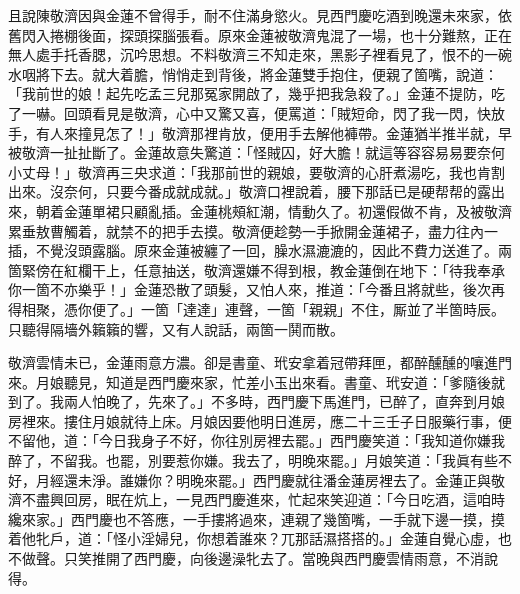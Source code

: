 且說陳敬濟因與金蓮不曾得手，耐不住滿身慾火。見西門慶吃酒到晚還未來家，依舊閃入捲棚後面，探頭探腦張看。原來金蓮被敬濟鬼混了一場，也十分難熬，正在無人處手托香腮，沉吟思想。不料敬濟三不知走來，黑影子裡看見了，恨不的一碗水咽將下去。就大着膽，悄悄走到背後，將金蓮雙手抱住，便親了箇嘴，說道：「我前世的娘！起先吃孟三兒那冤家開啟了，幾乎把我急殺了。」金蓮不提防，吃了一嚇。回頭看見是敬濟，心中又驚又喜，便罵道：{}「賊短命，閃了我一閃，快放手，有人來撞見怎了！」敬濟那裡肯放，便用手去解他褲帶。金蓮猶半推半就，早被敬濟一扯扯斷了。金蓮故意失驚道：「怪賊囚，好大膽！就這等容容易易要奈何小丈母！」{}敬濟再三央求道：「我那前世的親娘，要敬濟的心肝煮湯吃，我也肯割出來。沒奈何，只要今番成就成就。」敬濟口裡說着，腰下那話已是硬帮帮的露出來，朝着金蓮單裙只顧亂插。金蓮桃頰紅潮，情動久了。初還假做不肯，{}及被敬濟累垂敖曹觸着，就禁不的把手去摸。{}敬濟便趁勢一手掀開金蓮裙子，盡力往內一插，不覺沒頭露腦。原來金蓮被纏了一回，臊水濕漉漉的，因此不費力送進了。兩箇緊傍在紅欄干上，任意抽送，敬濟還嫌不得到根，教金蓮倒在地下：「待我奉承你一箇不亦樂乎！」金蓮恐散了頭髮，又怕人來，{}推道：「今番且將就些，後次再得相聚，憑你便了。」{}一箇「達達」連聲，一箇「親親」不住，厮並了半箇時辰。只聽得隔墻外籟籟的響，又有人說話，兩箇一鬨而散。

敬濟雲情未已，金蓮雨意方濃。卻是書童、玳安拿着冠帶拜匣，都醉醺醺的嚷進門來。月娘聽見，知道是西門慶來家，忙差小玉出來看。書童、玳安道：「爹隨後就到了。我兩人怕晚了，先來了。」不多時，西門慶下馬進門，已醉了，直奔到月娘房裡來。摟住月娘就待上床。月娘因要他明日進房，應二十三壬子日服藥行事，便不留他，道：「今日我身子不好，你往別房裡去罷。」西門慶笑道：「我知道你嫌我醉了，不留我。也罷，別要惹你嫌。我去了，明晚來罷。」{}月娘笑道：「我眞有些不好，月經還未淨。誰嫌你？明晚來罷。」西門慶就往潘金蓮房裡去了。金蓮正與敬濟不盡興回房，眠在炕上，一見西門慶進來，忙起來笑迎道：「今日吃酒，這咱時纔來家。」西門慶也不答應，一手摟將過來，連親了幾箇嘴，一手就下邊一摸，摸着他牝戶，道：「怪小淫婦兒，你想着誰來？兀那話濕搭搭的。」{}金蓮自覺心虛，也不做聲。{}只笑推開了西門慶，向後邊澡牝去了。當晚與西門慶雲情雨意，不消說得。

